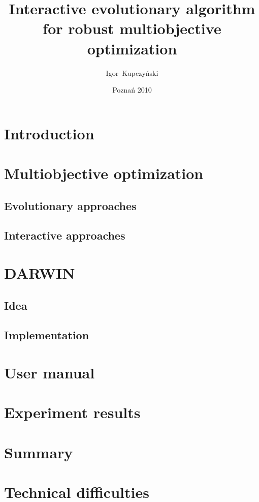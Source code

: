 \documentclass[12pt,a4paper,english,msc,twoside]{dcsbook2}
\author{Igor~Kupczyński}
\date{Poznań 2010}
\title{Interactive evolutionary algorithm \\ for robust multiobjective
  optimization}
\begin{document}
\maketitle
\frontmatter
\tableofcontents{}
\mainmatter

\chapter{Introduction}

\chapter{Multiobjective optimization}
\section{Evolutionary approaches}
\section{Interactive approaches}

\chapter{DARWIN}
\section{Idea}
\section{Implementation}

\chapter{User manual}

\chapter{Experiment results}

\chapter{Summary}


\backmatter



\appendix
\appendixpage
\addappheadtotoc
\chapter{Technical difficulties}
\end{document}
